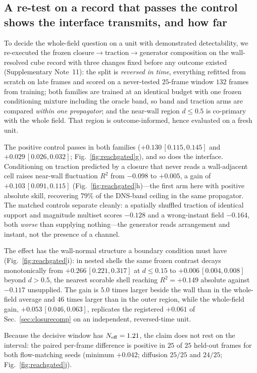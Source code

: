 \subsection{A re-test on a record that passes the control shows the interface transmits, and how
far}
\label{sec:reachgated}

To decide the whole-field question on a unit with demonstrated detectability, we re-executed the
frozen closure$\rightarrow$traction$\rightarrow$generator composition on the wall-resolved cube
record with three changes fixed before any outcome existed (Supplementary Note~11): the split is
\emph{reversed in time}, everything refitted from scratch on late frames and scored on a
never-tested $25$-frame window $132$ frames from training; both families are trained at an
identical budget with one frozen conditioning mixture including the oracle band, so band and
traction arms are compared \emph{within one propagator}; and the near-wall region $d\le0.5$ is
co-primary with the whole field. That region is outcome-informed, hence evaluated on a fresh unit.

The positive control passes in both families ($+0.130\,[0.115,0.145]$ and
$+0.029\,[0.026,0.032]$; Fig.~\ref{fig:reachgated}g), and so does the interface. Conditioning on
traction predicted by a closure that never reads a wall-adjacent cell raises near-wall
fluctuation $R^2$ from $-0.098$ to $+0.005$, a gain of $+0.103\,[0.091,0.115]$
(Fig.~\ref{fig:reachgated}h)---the first arm here with positive absolute skill, recovering
$79\%$ of the DNS-band ceiling in the same propagator. The matched controls
separate cleanly: a spatially shuffled traction of identical support and magnitude multiset
scores $-0.128$ and a wrong-instant field $-0.164$, both \emph{worse} than supplying
nothing---the generator reads arrangement and instant, not the presence of a channel.

The effect has the wall-normal structure a boundary condition must have
(Fig.~\ref{fig:reachgated}i): in nested shells the same frozen contrast decays monotonically from
$+0.266\,[0.221,0.317]$ at $d\le0.15$ to $+0.006\,[0.004,0.008]$ beyond $d>0.5$, the nearest
scorable shell reaching $R^2=+0.149$ absolute against $-0.117$ unsupplied. The gain is $5.0$ times
larger beside the wall than in the whole-field average and $46$ times larger than in the outer
region, while the whole-field gain, $+0.053\,[0.046,0.063]$, replicates the registered $+0.061$
of Sec.~\ref{sec:closurecomp} on an independent, reversed-time unit.

Because the decisive window has $N_{\rm eff}=1.21$, the claim does not rest on the interval:
the paired per-frame difference is positive in $25$ of $25$ held-out frames for both
flow-matching seeds (minimum $+0.042$; diffusion $25/25$ and $24/25$;
Fig.~\ref{fig:reachgated}j).

